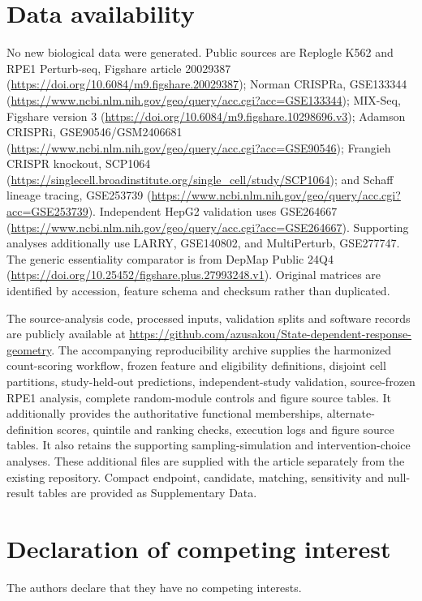 \documentclass[a4paper,fleqn]{cas-sc}
\makeatletter
\DeclareRobustCommand{\rev}[1]{{\color{red}\def\@citecolor{black}\def\@linkcolor{red}\def\@urlcolor{red}#1}}
\makeatother
\begin{document}
\section*{Data availability}
\rev{No new biological data were generated.} \rev{Public sources are Replogle K562 and RPE1 Perturb-seq, Figshare article 20029387 (\url{https://doi.org/10.6084/m9.figshare.20029387}); Norman CRISPRa, GSE133344 (\url{https://www.ncbi.nlm.nih.gov/geo/query/acc.cgi?acc=GSE133344}); MIX-Seq, Figshare version 3 (\url{https://doi.org/10.6084/m9.figshare.10298696.v3}); Adamson CRISPRi, GSE90546/GSM2406681 (\url{https://www.ncbi.nlm.nih.gov/geo/query/acc.cgi?acc=GSE90546}); Frangieh CRISPR knockout, SCP1064 (\url{https://singlecell.broadinstitute.org/single_cell/study/SCP1064}); and Schaff lineage tracing, GSE253739 (\url{https://www.ncbi.nlm.nih.gov/geo/query/acc.cgi?acc=GSE253739}).} \rev{Independent HepG2 validation uses GSE264667 (\url{https://www.ncbi.nlm.nih.gov/geo/query/acc.cgi?acc=GSE264667}).} \rev{Supporting analyses additionally use LARRY, GSE140802, and MultiPerturb, GSE277747.} \rev{The generic essentiality comparator is from DepMap Public 24Q4 (\url{https://doi.org/10.25452/figshare.plus.27993248.v1}).} \rev{Original matrices are identified by accession, feature schema and checksum rather than duplicated.}

\rev{The source-analysis code, processed inputs, validation splits and software records are publicly available at \url{https://github.com/azusakou/State-dependent-response-geometry}.} \rev{The accompanying reproducibility archive supplies the harmonized count-scoring workflow, frozen feature and eligibility definitions, disjoint cell partitions, study-held-out predictions, independent-study validation, source-frozen RPE1 analysis, complete random-module controls and figure source tables.} \rev{It additionally provides the authoritative functional memberships, alternate-definition scores, quintile and ranking checks, execution logs and figure source tables.} \rev{It also retains the supporting sampling-simulation and intervention-choice analyses.} \rev{These additional files are supplied with the article separately from the existing repository.} \rev{Compact endpoint, candidate, matching, sensitivity and null-result tables are provided as Supplementary Data.}

\section*{Declaration of competing interest}
The authors declare that they have no competing interests.
\end{document}
